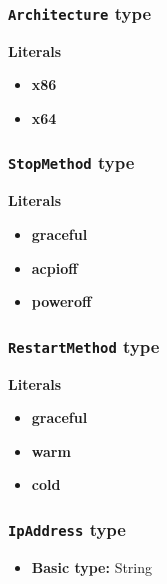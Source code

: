 \subsubsection{\texttt{Architecture} type}

\textbf{Literals}
\begin{itemize}
\item \textbf{x86} 
\end{itemize}
\begin{itemize}
\item \textbf{x64} 
\end{itemize}

\subsubsection{\texttt{StopMethod} type}

\textbf{Literals}
\begin{itemize}
\item \textbf{graceful} 
\end{itemize}
\begin{itemize}
\item \textbf{acpioff} 
\end{itemize}
\begin{itemize}
\item \textbf{poweroff} 
\end{itemize}

\subsubsection{\texttt{RestartMethod} type}

\textbf{Literals}
\begin{itemize}
\item \textbf{graceful} 
\end{itemize}
\begin{itemize}
\item \textbf{warm} 
\end{itemize}
\begin{itemize}
\item \textbf{cold} 
\end{itemize}

\subsubsection{\texttt{IpAddress} type}

\begin{itemize}
\item \textbf{Basic type:} String
\end{itemize}
